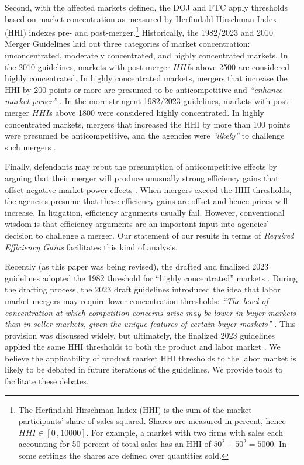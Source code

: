 \documentclass[12pt]{article}
\theoremstyle{prop}
\begin{document}
Second, with the affected markets defined, the DOJ and FTC apply thresholds based on market concentration as measured by Herfindahl-Hirschman Index (HHI) indexes pre- and post-merger.\footnote{
    The Herfindahl-Hirschman Index (HHI) is the sum of the market participants' share of sales squared. 
    Shares are measured in percent, hence $HHI\in[0\,,10000]$.
    For example, a market with two firms with sales each accounting for 50 percent of total sales has an HHI of $50^2 + 50^2=5000$. 
    In some settings the shares are defined over quantities sold.} 
Historically, the 1982/2023 and 2010 Merger Guidelines laid out three categories of market concentration: unconcentrated, moderately concentrated, and highly concentrated markets.   
In the 2010 guidelines, markets with post-merger $HHI$s above 2500 are considered highly concentrated. 
In highly concentrated markets, mergers that increase the HHI by 200 points or more are presumed to be anticompetitive and  \emph{``enhance market power''} \citep[][p.~19]{doj2010guidelines}.
In the more stringent 1982/2023 guidelines, markets with post-merger $HHI$s above 1800 were considered highly concentrated.   
In highly concentrated markets, mergers that increased the HHI by more than 100 points were presumed be anticompetitive, and the agencies were \emph{``likely''} to challenge such mergers \citep[][p.~15]{doj1982guidelines}.

Finally, defendants may rebut the presumption of anticompetitive effects by arguing that their merger will produce unusually strong efficiency gains that offset negative market power effects \citep[][p.~32]{doj2023guidelines}. 
When mergers exceed the HHI thresholds, the agencies presume that these efficiency gains are offset and hence prices will increase. 
In litigation, efficiency arguments usually fail.
However, conventional wisdom is that efficiency arguments are an important input into agencies' decision to challenge a merger. 
Our statement of our results in terms of \emph{Required Efficiency Gains} facilitates this kind of analysis. 

 
Recently (as this paper was being revised), the drafted and finalized 2023 guidelines adopted the 1982 threshold for ``highly concentrated''  markets \citep[][p.~6]{doj2023final}. 
During the drafting process, the 2023 draft guidelines introduced the idea that labor market mergers may require lower concentration thresholds: \emph{``The level of concentration at which
competition concerns arise may be lower in buyer markets than in seller markets, given the
unique features of certain buyer markets''} \citep[][p.~25]{doj2023guidelines}. 
This provision was discussed widely, but ultimately, the finalized 2023 guidelines applied the same HHI thresholds to both the product and labor market \citep[][p.~26]{doj2023final}. 
We believe the applicability of product market HHI thresholds to the labor market is likely to be debated in future iterations of the guidelines.
We provide tools to facilitate these debates. 
 
\end{document}
